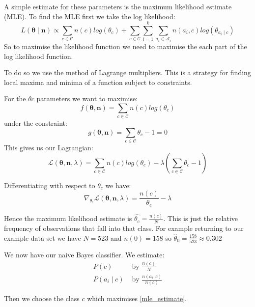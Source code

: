 A simple estimate for these parameters is the maximum likelihood estimate (MLE).
To find the MLE first we take the log likelihood:
\begin{equation}
	L(\mathbf{\theta} \mid \mathbf{n}) \propto \sum_{c \in \mathcal{C}}  n(c)log(\theta_c) + \sum_{c \in \mathcal{C}} \sum_{i=1}^k \sum_{a_i \in \mathcal{A}_i} n(a_i, c) log(\theta_{a_i \mid c}) 
\end{equation}
So to maximise the likelihood function we need to maximise the each part of the log likelihood function.

To do so we use the method of Lagrange multipliers.
This is a strategy for finding local maxima and minima of a function subject to constraints.

For the $\theta{c}$ parameters we want to maximise:
\begin{equation}
	f(\mathbf{\theta}, \mathbf{n}) = \sum_{c \in \mathcal{C}}  n(c)log(\theta_c)
\end{equation}
under the constraint:
\begin{equation}
	g(\mathbf{\theta}, \mathbf{n}) = \sum_{c \in \mathcal{C}}  \theta_c - 1 = 0
\end{equation}
This gives us our Lagrangian:
\begin{equation}
	\mathcal{L}(\mathbf{\theta}, \mathbf{n}, \lambda) = \sum_{c \in \mathcal{C}}  n(c)log(\theta_c) - \lambda(\sum_{c \in \mathcal{C}}  \theta_c - 1)
\end{equation}

Differentiating with respect to $\theta_c$ we have:
\begin{equation}
	\nabla_{\theta_c} \mathcal{L}(\mathbf{\theta}, \mathbf{n}, \lambda) = \frac{n(c)}{\theta_c} - \lambda
\end{equation}

Hence the maximum likelihood estimate is $\hat{\theta_c} = \frac{n(c)}{N}$.
This is just the relative frequency of observations that fall into that class.
For example returning to our example data set we have $N=523$ and $n(0)=158$ so $\hat\theta_0 = \frac{158}{523} \approx 0.302$


We now have our naive Bayes classifier.
We estimate:
\begin{align}
	P(c) & \text{ by } \frac{n(c)}{N} \\
	P(a_i \mid c) & \text{ by } \frac{n(a_i, c)}{n(c)}
\end{align}

Then we choose the class $c$ which maximises \cref{mle_estimate}.


